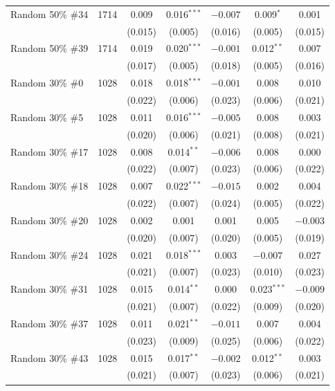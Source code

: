 \begin{table}[H]
\begin{tabular}{@{}lc*{5}{c}@{}}
    Random 50\% \#34 & 1714 & 0.009 & 0.016$^{***}$ & $-0.007$ & 0.009$^{*}$ & 0.001 \\
    & & (0.015) & (0.005) & (0.016) & (0.005) & (0.015) \\[0.3em]

    Random 50\% \#39 & 1714 & 0.019 & 0.020$^{***}$ & $-0.001$ & 0.012$^{**}$ & 0.007 \\
    & & (0.017) & (0.005) & (0.018) & (0.005) & (0.016) \\[0.3em]

    Random 30\% \#0 & 1028 & 0.018 & 0.018$^{***}$ & $-0.001$ & 0.008 & 0.010 \\
    & & (0.022) & (0.006) & (0.023) & (0.006) & (0.021) \\[0.3em]

    Random 30\% \#5 & 1028 & 0.011 & 0.016$^{***}$ & $-0.005$ & 0.008 & 0.003 \\
    & & (0.020) & (0.006) & (0.021) & (0.008) & (0.021) \\[0.3em]

    Random 30\% \#17 & 1028 & 0.008 & 0.014$^{**}$ & $-0.006$ & 0.008 & 0.000 \\
    & & (0.022) & (0.007) & (0.023) & (0.006) & (0.022) \\[0.3em]

    Random 30\% \#18 & 1028 & 0.007 & 0.022$^{***}$ & $-0.015$ & 0.002 & 0.004 \\
    & & (0.022) & (0.007) & (0.024) & (0.005) & (0.022) \\[0.3em]

    Random 30\% \#20 & 1028 & 0.002 & 0.001 & 0.001 & 0.005 & $-0.003$ \\
    & & (0.020) & (0.007) & (0.020) & (0.005) & (0.019) \\[0.3em]

    Random 30\% \#24 & 1028 & 0.021 & 0.018$^{***}$ & 0.003 & $-0.007$ & 0.027 \\
    & & (0.021) & (0.007) & (0.023) & (0.010) & (0.023) \\[0.3em]

    Random 30\% \#31 & 1028 & 0.015 & 0.014$^{**}$ & 0.000 & 0.023$^{***}$ & $-0.009$ \\
    & & (0.021) & (0.007) & (0.022) & (0.009) & (0.020) \\[0.3em]

    Random 30\% \#37 & 1028 & 0.011 & 0.021$^{**}$ & $-0.011$ & 0.007 & 0.004 \\
    & & (0.023) & (0.009) & (0.025) & (0.006) & (0.022) \\[0.3em]

    Random 30\% \#43 & 1028 & 0.015 & 0.017$^{**}$ & $-0.002$ & 0.012$^{**}$ & 0.003 \\
    & & (0.021) & (0.007) & (0.023) & (0.006) & (0.021) \\
    
    \bottomrule
    \end{tabular}
\end{table}
    
